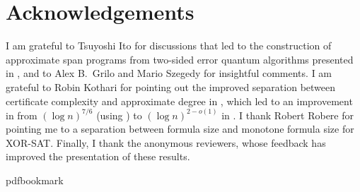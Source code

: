 \documentclass[11pt]{article}
\numberwithin{equation}{section}
\theoremstyle{definition}
\theoremstyle{plain}
\begin{document}
%



%
%


%

%

%
%
%
%
%
%
%
%
%
%
%
%
%
%
%
%
%
%
%
%
%
%
%
%
%
%
%
%
%
%
%
%
%
%
%
%
%
%
%
%
%
%
%
%
%
%
%
%
%
%
%
%
%
%
%
%
%
%
%
%
%
%
%
%
%
%
%
%
%
%
%
%
%
%
%
%
%
%
%
%
%
%
%
%
%
%
%
%
%
%
%
%
%
%
%
%
%
%
%
%
%
%
%
%
%
%
%
%
%

%
%
%
%
%
%
%
%
%
%
%
%
%
%
%
%
%
%
%
%
%
%
%
%
%
%
%
%
%
%
%
%
%
%
%
%
%
%
%
%
%
%
%
%
%
%
%
%
%
%
%
%
%
%
%
%
%
%
%
%
%
%
%
%
%
%
%
%
%
%
%
%
%
%
%
%
%
%
%
%
%
%
%
%
%
%
%
%
%
%
%
%
%
%
%
%
%
%
%
%
%
%
%
%
%
%
%
%
%
%
%
%
%
%
%
%
%
%
%
%
%
%
%
%
%
%
%
%
%
%

%

\section*{Acknowledgements}

I am grateful to Tsuyoshi Ito for discussions that led to the construction of approximate span programs from two-sided error quantum algorithms presented in , and to Alex B.~Grilo and Mario Szegedy for insightful comments. I am grateful to Robin Kothari for pointing out the improved separation between certificate complexity and approximate degree in \cite{BT17}, which led to an improvement in from $(\log n)^{7/6}$ (using \cite{ABK16}) to $(\log n)^{2-o(1)}$ in . 
I thank Robert Robere for pointing me to a separation between formula size and monotone formula size for XOR-SAT. %
Finally, I thank the anonymous reviewers, whose feedback has improved the presentation of these results.



\newcommand{\prelim}{Preliminary version in\ }\newcommand{\prelims}{Preliminary
  versions in\ }
\providecommand{\bibhead}[1]{}
\expandafter\ifx\csname pdfbookmark\endcsname\relax%
  \providecommand{\tocrefpdfbookmark}{}
\else\providecommand{\tocrefpdfbookmark}{%
   \hypertarget{tocreferences}{}%
   \pdfbookmark[1]{References}{tocreferences}}%
\fi
\end{document}
